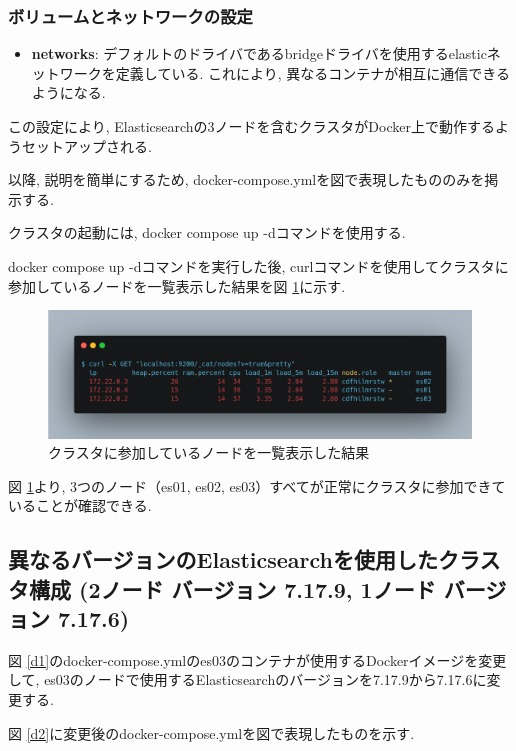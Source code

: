 \subsubsection*{ボリュームとネットワークの設定}
\begin{itemize}
  \item \textbf{networks}: デフォルトのドライバであるbridgeドライバを使用するelasticネットワークを定義している. これにより, 異なるコンテナが相互に通信できるようになる.
\end{itemize}

この設定により, Elasticsearchの3ノードを含むクラスタがDocker上で動作するようセットアップされる.

以降, 説明を簡単にするため, docker-compose.ymlを図で表現したもののみを掲示する.

クラスタの起動には, docker compose up -dコマンドを使用する.

docker compose up -dコマンドを実行した後, curlコマンドを使用してクラスタに参加しているノードを一覧表示した結果を図 \ref{p1}に示す.

\begin{figure}[h]
  \begin{center}
    \includegraphics[width=160mm]{sotu/figure/curl-same.png}
    \caption{クラスタに参加しているノードを一覧表示した結果}
    \label{p1}
  \end{center}
\end{figure}

図 \ref{p1}より, 3つのノード（es01, es02, es03）すべてが正常にクラスタに参加できていることが確認できる.

\subsection{異なるバージョンのElasticsearchを使用したクラスタ構成 (2ノード バージョン 7.17.9, 1ノード バージョン 7.17.6)}

図 \ref{d1}のdocker-compose.ymlのes03のコンテナが使用するDockerイメージを変更して, es03のノードで使用するElasticsearchのバージョンを7.17.9から7.17.6に変更する.

図 \ref{d2}に変更後のdocker-compose.ymlを図で表現したものを示す.

